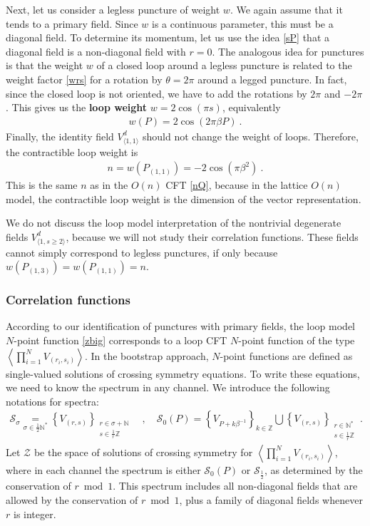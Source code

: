 \documentclass[12pt, a4paper]{article}
\newcommand{\myindex}[1]{\textbf{\boldmath #1}}
\begin{document}
Next, let us consider a legless puncture of weight $w$. We again assume that it tends to a primary field. Since $w$ is a continuous parameter, this must be a diagonal field. To determine its momentum, let us use the idea \eqref{sP} that a diagonal field is a non-diagonal field with $r=0$. The analogous idea for punctures is that the weight $w$ of a closed loop around a legless puncture is related to the weight factor \eqref{wrs} for a rotation by $\theta = 2\pi$ around a legged puncture. In fact, since the closed loop is not oriented, we have to add the rotations by $2\pi$ and $-2\pi$. This gives us the \myindex{loop weight} $w=2\cos(\pi s)$, equivalently
\begin{align}
 \boxed{w(P) = 2\cos(2\pi\beta P)}\ .
 \label{wP}
\end{align}
Finally, the identity field $V^d_{\langle 1,1\rangle}$ should not change the weight of loops.
Therefore, the contractible loop weight is
\begin{align}
 \boxed{n= w\left(P_{(1,1)}\right) = -2\cos(\pi \beta^2)} \ .
 \label{ncb}
\end{align}
This is the same $n$ as in the $O(n)$ CFT \eqref{nQ}, because in the lattice $O(n)$ model, the contractible loop weight is the dimension of the vector representation.

We do not discuss the loop model interpretation of the nontrivial degenerate fields $V^d_{\langle 1,s\geq 2\rangle}$, because we will not study their correlation functions. These fields cannot simply correspond to legless punctures, if only because $w(P_{(1,3)})=w(P_{(1,1)})=n$.


\subsubsection{Correlation functions}\label{sec:cf}

According to our identification of punctures with primary fields, the loop model $N$-point function \eqref{zbig} corresponds to a loop CFT $N$-point function of the type $\left<\prod_{i=1}^N V_{(r_i,s_i)}\right>$. In the bootstrap approach, $N$-point functions are defined as single-valued solutions of crossing symmetry equations. To write these equations, we need to know the spectrum in any channel. We introduce the following notations for spectra:
\begin{align}
 \mathcal{S}_{\sigma} \underset{\sigma\in \frac12\mathbb{N}^*}{=} \left\{V_{(r,s)}\right\}_{\substack{r\in \sigma+\mathbb{N} \\ s\in\frac{1}{r}\mathbb{Z}}} \quad , \quad \mathcal{S}_0(P) = \left\{V_{P+k\beta^{-1}}\right\}_{k\in\mathbb{Z}} \bigcup \left\{V_{(r,s)}\right\}_{\substack{r\in\mathbb{N}^* \\ s\in\frac{1}{r}\mathbb{Z}}}\ .
 \label{sxs}
\end{align}
Let $\mathcal{Z}$ be the space of solutions of crossing symmetry for $\left<\prod_{i=1}^N V_{(r_i,s_i)}\right>$, where in each channel the spectrum is either $\mathcal{S}_0(P)$ or $\mathcal{S}_\frac12$, as determined by the conservation of $r\bmod 1$. This spectrum includes all non-diagonal fields that are allowed by the conservation of $r\bmod 1$, plus a family of diagonal fields whenever $r$ is integer. 
\end{document}
